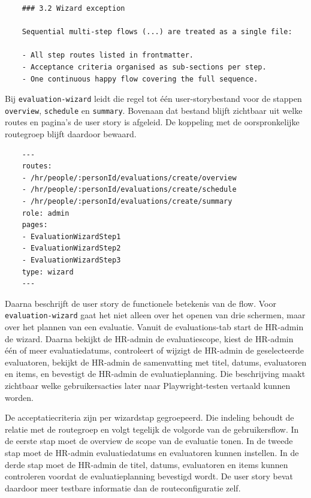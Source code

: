 \begin{verbatim}
    ### 3.2 Wizard exception
    
    Sequential multi-step flows (...) are treated as a single file:
    
    - All step routes listed in frontmatter.
    - Acceptance criteria organised as sub-sections per step.
    - One continuous happy flow covering the full sequence.
\end{verbatim}

Bij \texttt{evaluation-wizard} leidt die regel tot één user-storybestand voor de stappen \texttt{overview}, \texttt{schedule} en \texttt{summary}. Bovenaan dat bestand blijft zichtbaar uit welke routes en pagina's de user story is afgeleid. De koppeling met de oorspronkelijke routegroep blijft daardoor bewaard.

\begin{verbatim}
    ---
    routes:
    - /hr/people/:personId/evaluations/create/overview
    - /hr/people/:personId/evaluations/create/schedule
    - /hr/people/:personId/evaluations/create/summary
    role: admin
    pages:
    - EvaluationWizardStep1
    - EvaluationWizardStep2
    - EvaluationWizardStep3
    type: wizard
    ---
\end{verbatim}

Daarna beschrijft de user story de functionele betekenis van de flow. Voor \texttt{evaluation-wizard} gaat het niet alleen over het openen van drie schermen, maar over het plannen van een evaluatie. Vanuit de evaluations-tab start de HR-admin de wizard. Daarna bekijkt de HR-admin de evaluatiescope, kiest de HR-admin één of meer evaluatiedatums, controleert of wijzigt de HR-admin de geselecteerde evaluatoren, bekijkt de HR-admin de samenvatting met titel, datums, evaluatoren en items, en bevestigt de HR-admin de evaluatieplanning. Die beschrijving maakt zichtbaar welke gebruikersacties later naar Playwright-testen vertaald kunnen worden.

De acceptatiecriteria zijn per wizardstap gegroepeerd. Die indeling behoudt de relatie met de routegroep en volgt tegelijk de volgorde van de gebruikersflow. In de eerste stap moet de overview de scope van de evaluatie tonen. In de tweede stap moet de HR-admin evaluatiedatums en evaluatoren kunnen instellen. In de derde stap moet de HR-admin de titel, datums, evaluatoren en items kunnen controleren voordat de evaluatieplanning bevestigd wordt. De user story bevat daardoor meer testbare informatie dan de routeconfiguratie zelf.

